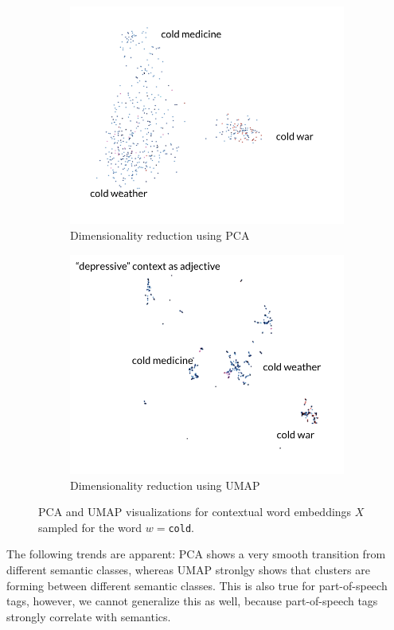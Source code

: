 \documentclass[a4paper,12pt,oneside,openright]{report}
\begin{document}
\begin{figure}[H]
\begin{subfigure}{.45\textwidth}
  \centering
  \includegraphics[width=.8\linewidth]{./assets/analysis/cold_pca.png}
  \caption{Dimensionality reduction using PCA}
  \label{fig:sfig1}
\end{subfigure}%
\hfill
\begin{subfigure}{.45\textwidth}
  \centering
  \includegraphics[width=.8\linewidth]{./assets/analysis/cold_umap.png}
  \caption{Dimensionality reduction using UMAP}
  \label{fig:sfig2}
\end{subfigure}
\caption{PCA and UMAP visualizations for contextual word embeddings $X$ sampled for the word $w=$\texttt{cold}. }
\label{fig:cold_tensorboard}
\end{figure}


The following trends are apparent: 
PCA shows a very smooth transition from different semantic classes, whereas UMAP stronlgy shows that clusters are forming between different semantic classes.
This is also true for part-of-speech tags, however, we cannot generalize this as well, because part-of-speech tags strongly correlate with semantics.
\end{document}
